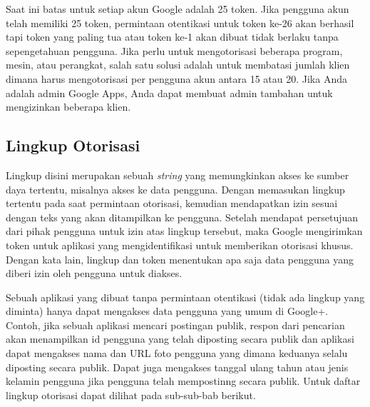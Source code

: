 Saat ini batas untuk setiap akun Google adalah 25 token. Jika pengguna akun
telah memiliki 25 token, permintaan otentikasi untuk token ke-26 akan berhasil
tapi token yang paling tua atau token ke-1 akan dibuat tidak berlaku tanpa
sepengetahuan pengguna. Jika perlu untuk mengotorisasi beberapa program, mesin,
atau perangkat, salah satu solusi adalah untuk membatasi jumlah klien dimana
harus mengotorisasi per pengguna akun antara 15 atau 20. Jika Anda adalah admin
Google Apps, Anda dapat membuat admin tambahan untuk mengizinkan beberapa klien.

\subsection{Lingkup Otorisasi \cite{Scope:2013}}
Lingkup disini merupakan sebuah {\it string} yang memungkinkan akses ke sumber
daya tertentu, misalnya akses ke data pengguna. Dengan memasukan lingkup tertentu
pada saat permintaan otorisasi, kemudian mendapatkan izin sesuai dengan teks
yang akan ditampilkan ke pengguna. Setelah mendapat persetujuan dari pihak
pengguna untuk izin atas lingkup tersebut, maka Google mengirimkan token untuk
aplikasi yang mengidentifikasi untuk memberikan otorisasi khusus. Dengan kata
lain, lingkup dan token menentukan apa saja data pengguna yang diberi izin oleh
pengguna untuk diakses.

Sebuah aplikasi yang dibuat tanpa permintaan otentikasi (tidak ada lingkup yang
diminta) hanya dapat mengakses data pengguna yang umum di Google+. Contoh, jika
sebuah aplikasi mencari postingan publik, respon dari pencarian akan menampilkan
id pengguna yang telah diposting secara publik dan aplikasi dapat mengakses nama
dan URL foto pengguna yang dimana keduanya selalu diposting secara publik. Dapat
juga mengakses tanggal ulang tahun atau jenis kelamin pengguna jika pengguna
telah mempostinng secara publik. Untuk daftar lingkup otorisasi dapat dilihat
pada sub-sub-bab berikut.

